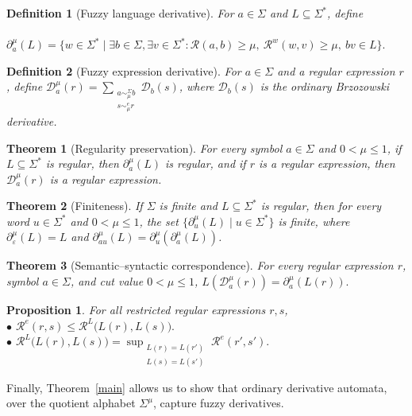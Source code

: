 \documentclass{easychair}
\newtheorem{definition}{Definition}
\newtheorem{theorem}{Theorem}
\newtheorem{proposition}{Proposition}
\begin{document}
\begin{definition}[Fuzzy language derivative]
For $a\in\Sigma$ and $L\subseteq\Sigma^\ast$, define\\
\ \ \ \ $
\partial_a^\mu(L)
=
\{w\in\Sigma^\ast\mid
\exists b\in\Sigma,\exists v\in\Sigma^\ast:
\mathcal R(a,b)\ge\mu,\ 
\mathcal R^w(w,v)\ge\mu,\ 
bv\in L
\}.
$
\end{definition}

\begin{definition}[Fuzzy expression derivative]
For $a\in\Sigma$ and a regular expression $r$, define
$\mathcal D_a^\mu(r)=\sum\limits_{\substack{a\sim_\mu^\Sigma b\\ s\sim_\mu^e r}}\mathcal D_b(s)$,
where $\mathcal D_b(s)$ is the ordinary Brzozowski derivative.
\end{definition}
\begin{theorem}[Regularity preservation] For every symbol $a\in\Sigma$ and $0<\mu\le1$, if $L\subseteq\Sigma^\ast$ is regular, then
$\partial_a^\mu(L)$ is regular, and if $r$ is a regular expression, then $\mathcal D_a^\mu(r)$ is a regular expression.
\end{theorem}

\begin{theorem}[Finiteness]\label{finiteness}
If $\Sigma$ is finite and $L\subseteq\Sigma^\ast$ is regular, then for every word $u\in \Sigma^\ast$ and $0<\mu\le1$, the set
$
\{\partial_u^\mu(L)\mid u\in\Sigma^\ast\}
$
is finite, where $\partial_\varepsilon^\mu(L)=L$ and $\partial_{au}^\mu(L)=\partial_{u}^\mu(\partial_{a}^\mu(L))$.
\end{theorem}

\begin{theorem}[Semantic--syntactic correspondence]
For every regular expression $r$, symbol \mbox{$a\in\Sigma$}, and cut value
$0<\mu\le1$, $
L(\mathcal D_a^\mu(r))
=
\partial_a^\mu(L(r)).
$
\end{theorem}

\begin{proposition} For all restricted regular expressions $r,s$,\\
$\bullet$ 
$
\mathcal R^e(r,s)
\le
\mathcal R^L\bigl(L(r),L(s)\bigr).
$\\
$\bullet$ $\mathcal R^L\bigl(L(r),L(s)\bigr)
= \sup_{\substack{L(r)=L(r')\\
L(s)=L(s')}}\mathcal R^e(r',s').$
\end{proposition}

Finally, Theorem~\ref{main} allows us to show that ordinary derivative
automata, over the quotient alphabet $\Sigma^\mu$, capture fuzzy derivatives.
\end{document}
